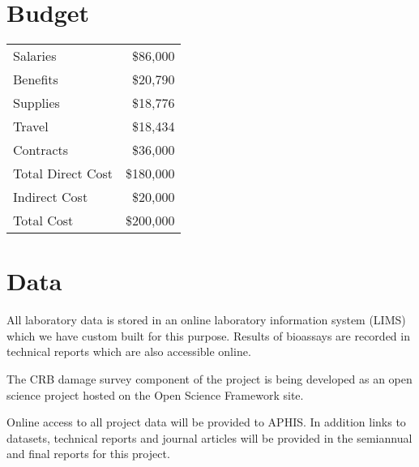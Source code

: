 \documentclass[14pt,english,letterpaper]{scrartcl}
\begin{document}
\section{Budget} 



\begin{tabular}{ lr } 
	\hline
	Salaries          &\$86,000\\
	Benefits          &\$20,790\\ 
	Supplies          &\$18,776\\ 
	Travel            &\$18,434\\ 
	Contracts         &\$36,000\\ 
	\hline
	Total Direct Cost &\$180,000\\ 
	Indirect Cost     &\$20,000\\ 
	\hline
	Total Cost        &\$200,000\\ 
	\hline
\end{tabular}

\section{Data} 


All laboratory data is stored in an online laboratory information system (LIMS) which we have custom built for this purpose. Results of bioassays are recorded in technical reports which are also accessible online.

The CRB damage survey component of the project is being developed as an open science project hosted on the Open Science Framework site.

Online access to all project data will be provided to APHIS. In addition links to datasets, technical reports and journal articles will be provided in the semiannual and final reports for this project.
\end{document}
